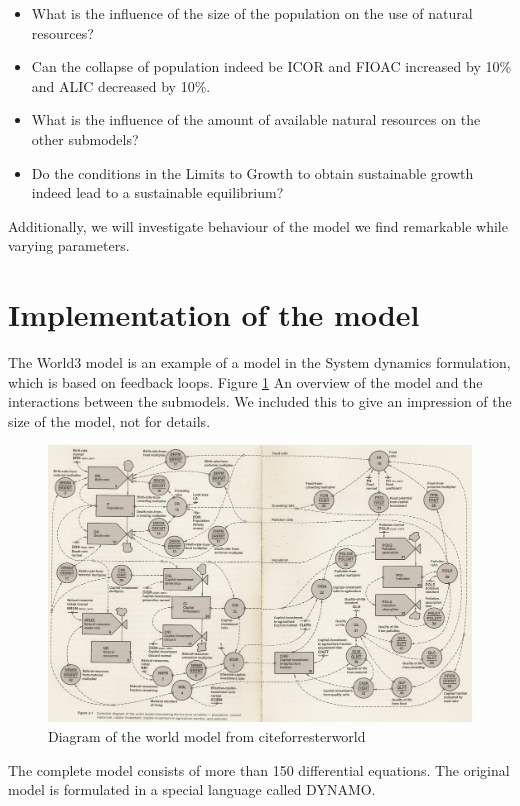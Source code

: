 \documentclass[10pt,a4paper]{scrartcl}
\begin{document}
\begin{itemize}
	\item What is the influence of the size of the population on the use of natural resources?
	\item Can the collapse of population indeed be ICOR and FIOAC increased by 10\% and ALIC decreased by 10\%.
	\item What is the influence of the amount of available natural resources on the other submodels?
	\item Do the conditions in the Limits to Growth to obtain sustainable growth indeed lead to a sustainable equilibrium?
\end{itemize}

Additionally, we will investigate behaviour of the model we find remarkable while varying parameters.

\section*{Implementation of the model}

The World3 model is an example of a model in the System dynamics formulation, which is based on feedback loops. Figure \ref{world3} An overview of the model and the interactions between the submodels. We included this to give an impression of the size of the model, not for details.

\begin{figure}
\centering
\includegraphics[width=\textwidth]{./plaatjes/model.png}
\caption{Diagram of the world model from cite{forresterworld}}
\label{world3}
\end{figure}

The complete model consists of more than 150 differential equations. The original model is formulated in a special language called DYNAMO.
\end{document}
